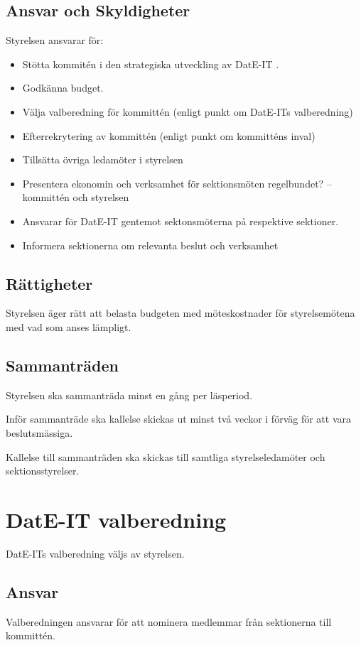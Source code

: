\documentclass{article}
\begin{document}
\subsection{Ansvar och Skyldigheter}
Styrelsen ansvarar för:
\begin{itemize}
    \item Stötta kommitén i den strategiska utveckling av DatE-IT .
    \item Godkänna budget.
    \item Välja valberedning för kommittén (enligt punkt om DatE-ITs valberedning)
    \item Efterrekrytering av kommittén (enligt punkt om kommitténs inval)
    \item Tillsätta övriga ledamöter i styrelsen
    \item Presentera ekonomin och verksamhet för sektionsmöten regelbundet? – kommittén och styrelsen
    \item Ansvarar för DatE-IT gentemot sektonsmöterna på respektive sektioner.
    \item Informera sektionerna om relevanta beslut och verksamhet
\end{itemize}

\subsection{Rättigheter}
Styrelsen äger rätt att belasta budgeten med möteskostnader för styrelsemötena med vad som anses lämpligt.

\subsection{Sammanträden}
Styrelsen ska sammanträda minst en gång per läsperiod.

Inför sammanträde ska kallelse skickas ut minst två veckor i förväg  för att vara beslutsmässiga.

Kallelse till sammanträden ska skickas till samtliga styrelseledamöter och sektionsstyrelser.

\section{DatE-IT valberedning}
DatE-ITs valberedning väljs av styrelsen. 

\subsection{Ansvar}
Valberedningen ansvarar för att nominera medlemmar från sektionerna till kommittén.
\end{document}
